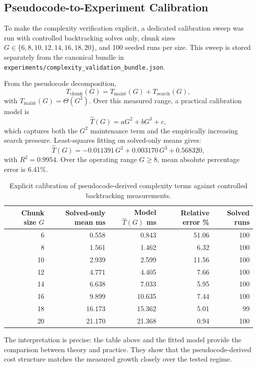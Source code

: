 \documentclass[12pt,a4paper]{report}
\begin{document}
\subsection{Pseudocode-to-Experiment Calibration}
To make the complexity verification explicit, a dedicated calibration sweep was run with controlled backtracking solves only, chunk sizes
\(G \in \{6,8,10,12,14,16,18,20\}\), and 100 seeded runs per size. This sweep is stored separately from the canonical bundle in
\texttt{experiments/complexity\_validation\_bundle.json}.

From the pseudocode decomposition,
\[
T_{\text{chunk}}(G) = T_{\text{maint}}(G) + T_{\text{search}}(G),
\]
with \(T_{\text{maint}}(G)=\Theta(G^2)\). Over this measured range, a practical calibration model is
\[
\hat{T}(G) = aG^2 + bG^3 + c,
\]
which captures both the \(G^2\) maintenance term and the empirically increasing search pressure. Least-squares fitting on solved-only means gives:
\[
\hat{T}(G) = -0.011391\,G^2 + 0.003170\,G^3 + 0.568320,
\]
with \(R^2 = 0.9954\). Over the operating range \(G\ge 8\), mean absolute percentage error is 6.41\%.

\begin{table}[H]
\centering
\small
\begin{tabular}{rrrrr}
\toprule
Chunk size \(G\) & Solved-only mean ms & Model \(\hat{T}(G)\) ms & Relative error \% & Solved runs \\
\midrule
6  & 0.558 & 0.843 & 51.06 & 100 \\
8  & 1.561 & 1.462 & 6.32 & 100 \\
10 & 2.939 & 2.599 & 11.56 & 100 \\
12 & 4.771 & 4.405 & 7.66 & 100 \\
14 & 6.638 & 7.033 & 5.95 & 100 \\
16 & 9.899 & 10.635 & 7.44 & 100 \\
18 & 16.173 & 15.362 & 5.01 & 99 \\
20 & 21.170 & 21.368 & 0.94 & 100 \\
\bottomrule
\end{tabular}
\caption{Explicit calibration of pseudocode-derived complexity terms against controlled backtracking measurements.}
\label{tab:complexity-calibration}
\end{table}

The interpretation is precise: the table above and the fitted model provide the comparison between theory and practice. They show that the pseudocode-derived cost structure matches the measured growth closely over the tested regime.
\end{document}
